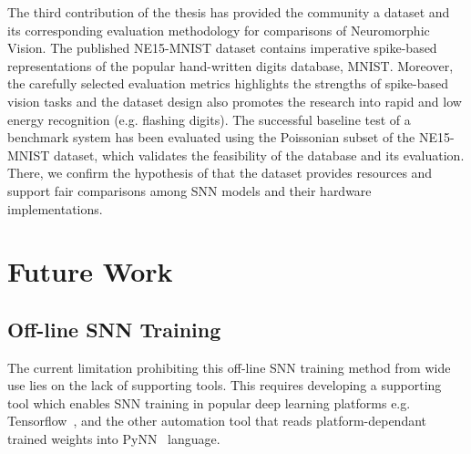 The third contribution of the thesis has provided the community a dataset and its corresponding evaluation methodology for comparisons of Neuromorphic Vision.
The published NE15-MNIST dataset contains imperative spike-based representations of the popular hand-written digits database, MNIST.
Moreover, the carefully selected evaluation metrics highlights the strengths of spike-based vision tasks and the dataset design also promotes the research into rapid and low energy recognition (e.g. flashing digits).
The successful baseline test of a benchmark system has been evaluated using the Poissonian subset of the NE15-MNIST dataset, which validates the feasibility of the database and its evaluation.
There, we confirm the hypothesis of that the dataset provides resources and support fair comparisons among SNN models and their hardware implementations.

%



\section{Future Work}
\subsection{Off-line SNN Training}
The current limitation prohibiting this off-line SNN training method from wide use lies on the lack of supporting tools.
This requires developing a supporting tool which enables SNN training in popular deep learning platforms e.g. Tensorflow~\cite{tensorflow2015-whitepaper}, and the other automation tool that reads platform-dependant trained weights into PyNN~\cite{davison2008pynn} language.

